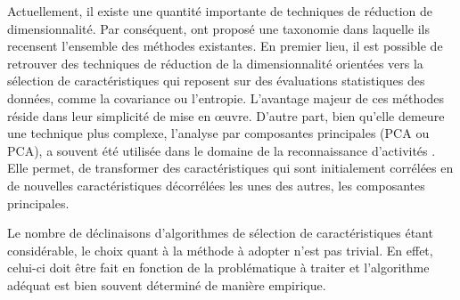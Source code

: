 Actuellement, il existe une quantité importante de techniques de réduction de dimensionnalité. Par conséquent, \cite{VanDerMaaten2009} ont proposé une taxonomie dans laquelle ils recensent l'ensemble des méthodes existantes. En premier lieu, il est possible de retrouver des techniques de réduction de la dimensionnalité orientées vers la sélection de caractéristiques qui reposent sur des évaluations statistiques des données, comme la covariance ou l'entropie. L'avantage majeur de ces méthodes réside dans leur simplicité de mise en {\oe}uvre. D'autre part, bien qu'elle demeure une technique plus complexe, l'analyse par composantes principales (\acl{PCA} ou \acs{PCA}), a souvent été utilisée dans le domaine de la reconnaissance d'activités \citep{He2009, Altun2010, Chen2012, Leightley2013}. Elle permet, de transformer des caractéristiques qui sont initialement corrélées en de nouvelles caractéristiques décorrélées les unes des autres, les composantes principales.%

Le nombre de déclinaisons d'algorithmes de sélection de caractéristiques étant considérable, le choix quant à la méthode à adopter n'est pas trivial. En effet, celui-ci doit être fait en fonction de la problématique à traiter et l'algorithme adéquat est bien souvent déterminé de manière empirique. %

